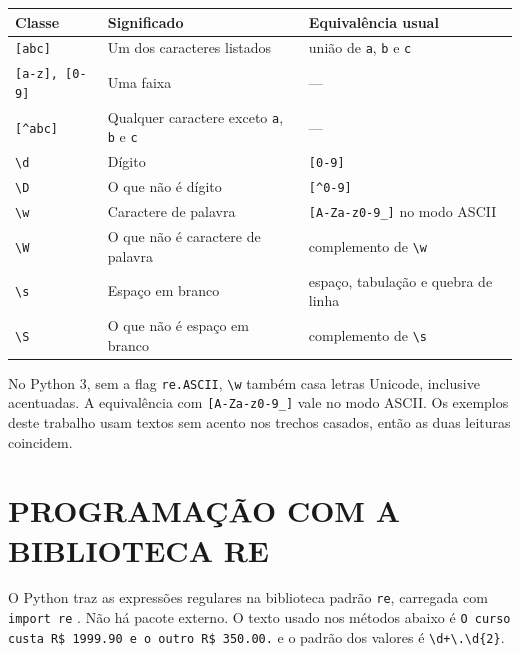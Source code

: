 \documentclass[
    12pt,
    oneside,
    a4paper,
    chapter=TITLE,
    section=TITLE,
    sumario=abnt-6027-2012
]{abntex2}
\begin{document}
\begin{quadro}[!h]
    \centering
    \small
    \begin{tabular}{|p{3.4cm}|p{5.4cm}|p{5.2cm}|}
        \hline
        \textbf{Classe} & \textbf{Significado} & \textbf{Equivalência usual} \\
        \hline
        \hline
        \verb|[abc]| & Um dos caracteres listados & união de \texttt{a}, \texttt{b} e \texttt{c} \\
        \hline
        \verb|[a-z], [0-9]| & Uma faixa & --- \\
        \hline
        \verb|[^abc]| & Qualquer caractere exceto \texttt{a}, \texttt{b} e \texttt{c} & --- \\
        \hline
        \verb|\d| & Dígito & \verb|[0-9]| \\
        \hline
        \verb|\D| & O que não é dígito & \verb|[^0-9]| \\
        \hline
        \verb|\w| & Caractere de palavra & \verb|[A-Za-z0-9_]| no modo ASCII \\
        \hline
        \verb|\W| & O que não é caractere de palavra & complemento de \verb|\w| \\
        \hline
        \verb|\s| & Espaço em branco & espaço, tabulação e quebra de linha \\
        \hline
        \verb|\S| & O que não é espaço em branco & complemento de \verb|\s| \\
        \hline
    \end{tabular}
\end{quadro}

No Python 3, sem a flag \texttt{re.ASCII}, \verb|\w| também casa letras Unicode, inclusive acentuadas. A equivalência com \verb|[A-Za-z0-9_]| vale no modo ASCII. Os exemplos deste trabalho usam textos sem acento nos trechos casados, então as duas leituras coincidem.

\chapter{PROGRAMAÇÃO COM A BIBLIOTECA RE}
\label{cap:re}

O Python traz as expressões regulares na biblioteca padrão \texttt{re}, carregada com \texttt{import re} \cite{pythonre}. Não há pacote externo. O texto usado nos métodos abaixo é \texttt{O curso custa R\$ 1999.90 e o outro R\$ 350.00.} e o padrão dos valores é \verb|\d+\.\d{2}|.
\end{document}
